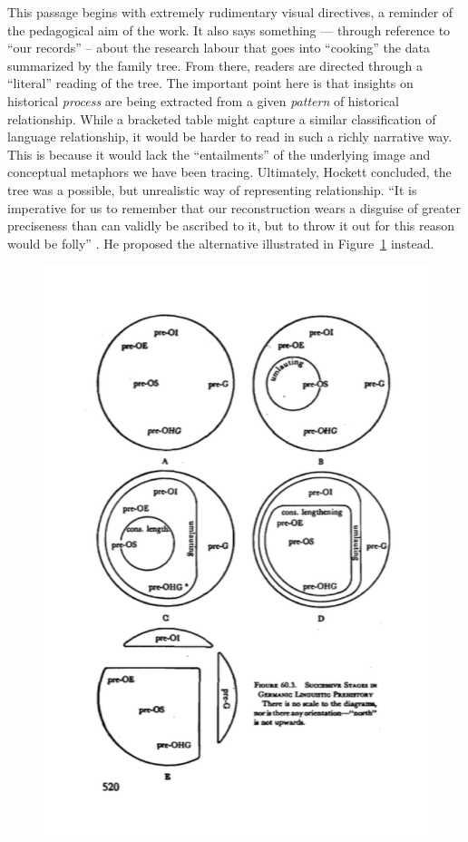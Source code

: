 \documentclass[output=paper]{langscibook}
\begin{document}
This passage begins with extremely rudimentary visual directives, a reminder of the pedagogical aim of the work. It also says something — through reference to ``our records'' -- about the research labour that goes into ``cooking'' the data summarized by the family tree. From there, readers are directed through a ``literal'' reading of the tree. The important point here is that insights on historical \emph{process} are being extracted from a given \emph{pattern} of historical relationship. While a bracketed table might capture a similar classification of language relationship, it would be harder to read in such a richly narrative way. This is because it would lack the ``entailments'' of the underlying image and conceptual metaphors we have been tracing. Ultimately, Hockett concluded, the tree was a possible, but unrealistic way of representing relationship. ``It is imperative for us to remember that our reconstruction wears a disguise of greater preciseness than can validly be ascribed to it, but to throw it out for this reason would be folly'' \citep[523]{Hockett19591958}. He proposed the alternative illustrated in Figure~\ref{fig:kaplan:hockett1959520} instead.

\begin{figure}
    \centering
    \includegraphics[scale=0.8]{figures/hockett1958-520.png}
    \caption{\citet[520]{Hockett19591958}}
    \label{fig:kaplan:hockett1959520}
\end{figure}
\end{document}
